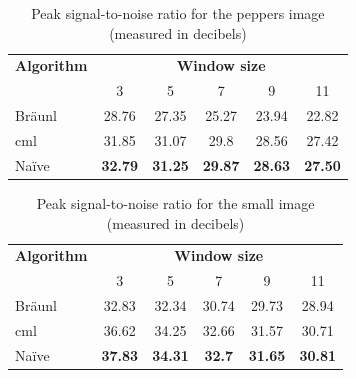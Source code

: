 \begin{table}
\centering
\caption[Peak signal-to-noise for the peppers image]{Peak signal-to-noise ratio for the peppers image (measured in decibels)}
\begin{tabular}{@{}lccccc@{}}
\toprule
\multicolumn{1}{c}{\textbf{Algorithm}} & \multicolumn{5}{c}{\textbf{Window size}}                                          \\
                                       & 3              & 5              & 7              & 9              & 11            \\ \midrule
Bräunl                                 & 28.76          & 27.35          & 25.27          & 23.94          & 22.82         \\
\gls{cml}                                    & 31.85          & 31.07          & 29.8           & 28.56          & 27.42         \\
Naïve                                  & \textbf{32.79} & \textbf{31.25} & \textbf{29.87} & \textbf{28.63} & \textbf{27.50} \\ \bottomrule
\end{tabular}
\label{tab:median:psnrpeppers}
\end{table}

\begin{table}
\centering
\caption[Peak signal-to-noise for the small image]{Peak signal-to-noise ratio for the small image (measured in decibels)}
\label{tab:median:psnrsmall}
\begin{tabular}{@{}lccccc@{}}
\toprule
\multicolumn{1}{c}{\textbf{Algorithm}} & \multicolumn{5}{c}{\textbf{Window size}}                                          \\
                                       & 3              & 5              & 7             & 9              & 11             \\ \midrule
Bräunl                                 & 32.83          & 32.34          & 30.74         & 29.73          & 28.94          \\
\gls{cml}                                    & 36.62          & 34.25          & 32.66         & 31.57          & 30.71          \\
Naïve                                  & \textbf{37.83} & \textbf{34.31} & \textbf{32.7} & \textbf{31.65} & \textbf{30.81} \\ \bottomrule
\end{tabular}
\end{table}

